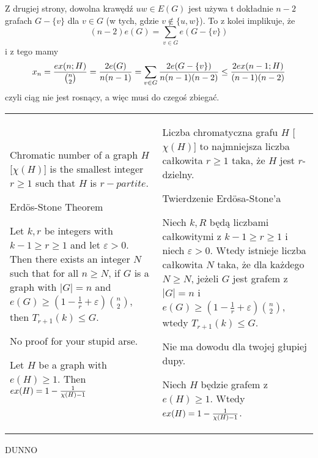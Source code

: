 Z drugiej strony, dowolna krawędź $uw\in E(G)$ jest używa t dokładnie $n-2$ grafach $G-\{v\}$ dla $v\in G$ (w tych, gdzie $v\notin\{u,w\}$). To z kolei implikuje, że
$$(n-2)e(G)=\sum\limits_{v\in G}e(G-\{v\})$$
i z tego mamy
$$x_n={ex(n;H)\over {n\choose2}}={2e(G)\over n(n-1)}=\sum\limits_{v\in G}{2e(G-\{v\})\over n(n-1)(n-2)}\leq {2ex(n-1;H)\over (n-1)(n-2)}$$
czyli ciąg nie jest rosnący, a więc musi do czegoś zbiegać.
\medskip

\medskip

\begin{tabularx}{\textwidth}{ X!{\color{git90gray}\vrule} X }

    {\color{def}Chromatic number} of a graph $H$ [$\chi(H)$] is the smallest integer $r\geq1$ such that $H$ is $r-partite$.
    \medskip

    {\color{def}Erd\"os-Stone Theorem}

    Let $k,r$ be integers with $k-1\geq r\geq1$ and let $\varepsilon>0$. Then there exists an integer $N$ such that for all $n\geq N$, if $G$ is a graph with $|G|=n$ and $e(G)\geq(1-\frac1r+\varepsilon){n\choose 2}$, then $T_{r+1}(k)\leq G$.

    No proof for your stupid arse.
    \medskip

    Let $H$ be a graph with $e(H)\geq1$. Then $ex(H)=1-{1\over \chi(H)-1}$

    &
    
    {\color{def}Liczba chromatyczna} grafu $H$ [$\chi(H)$] to najmniejsza liczba całkowita $r\geq1$ taka, że $H$ jest $r$-dzielny.
    \medskip

    {\color{def}Twierdzenie Erd\"osa-Stone'a}

    Niech $k,R$ będą liczbami całkowitymi z $k-1\geq r\geq1$ i niech $\varepsilon>0$. Wtedy istnieje liczba całkowita $N$ taka, że dla każdego $N\geq N$, jeżeli $G$ jest grafem z $|G|=n$ i $e(G)\geq (1-\frac1r+\varepsilon){n\choose 2}$, wtedy $T_{r+1}(k)\leq G$.

    Nie ma dowodu dla twojej głupiej dupy.
    \medskip

    Niech $H$ będzie grafem z $e(H)\geq1$. Wtedy $ex(H)=1-{1\over\chi(H)-1}$.

\end{tabularx}

\medskip

\medskip

DUNNO
\medskip

\medskip

